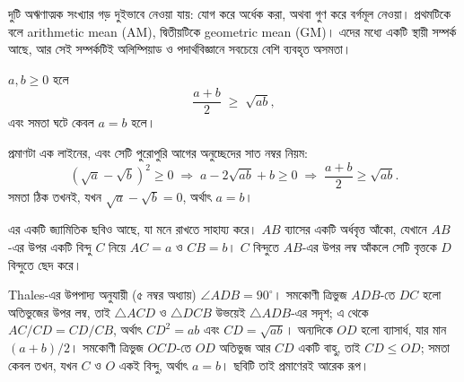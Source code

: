 \documentclass[11pt]{article}
\begin{document}
দুটি অঋণাত্মক সংখ্যার গড় দুইভাবে নেওয়া যায়: যোগ করে অর্ধেক করা, অথবা গুণ করে
বর্গমূল নেওয়া। প্রথমটিকে বলে arithmetic mean (AM), দ্বিতীয়টিকে geometric mean
(GM)। এদের মধ্যে একটি স্থায়ী সম্পর্ক আছে, আর সেই সম্পর্কটিই অলিম্পিয়াড ও
পদার্থবিজ্ঞানে সবচেয়ে বেশি ব্যবহৃত অসমতা।

\begin{idea}[দুই চলকের AM--GM]
$a, b \geq 0$ হলে
\[
  \frac{a+b}{2} \;\geq\; \sqrt{ab} ,
\]
এবং সমতা ঘটে কেবল $a = b$ হলে।
\end{idea}

প্রমাণটা এক লাইনের, এবং সেটি পুরোপুরি আগের অনুচ্ছেদের সাত নম্বর নিয়ম:
\[
  \left(\sqrt{a} - \sqrt{b}\right)^{2} \geq 0
  \;\Longrightarrow\; a - 2\sqrt{ab} + b \geq 0
  \;\Longrightarrow\; \frac{a+b}{2} \geq \sqrt{ab} .
\]
সমতা ঠিক তখনই, যখন $\sqrt{a} - \sqrt{b} = 0$, অর্থাৎ $a = b$।

এর একটি জ্যামিতিক ছবিও আছে, যা মনে রাখতে সাহায্য করে। $AB$ ব্যাসের একটি
অর্ধবৃত্ত আঁকো, যেখানে $AB$-এর উপর একটি বিন্দু $C$ নিয়ে $AC = a$ ও $CB = b$।
$C$ বিন্দুতে $AB$-এর উপর লম্ব আঁকলে সেটি বৃত্তকে $D$ বিন্দুতে ছেদ করে।

\begin{center}
\end{center}

Thales-এর উপপাদ্য অনুযায়ী (৫ নম্বর অধ্যায়) $\angle ADB = 90^{\circ}$।
সমকোণী ত্রিভুজ $ADB$-তে $DC$ হলো অতিভুজের উপর লম্ব, তাই $\triangle ACD$ ও
$\triangle DCB$ উভয়েই $\triangle ADB$-এর সদৃশ; এ থেকে $AC/CD = CD/CB$, অর্থাৎ
$CD^2 = ab$ এবং $CD = \sqrt{ab}$। অন্যদিকে $OD$ হলো ব্যাসার্ধ, যার মান
$(a+b)/2$। সমকোণী ত্রিভুজ $OCD$-তে $OD$ অতিভুজ আর $CD$ একটি বাহু, তাই
$CD \leq OD$; সমতা কেবল তখন, যখন $C$ ও $O$ একই বিন্দু, অর্থাৎ $a = b$। ছবিটি
তাই প্রমাণেরই আরেক রূপ।
\end{document}
